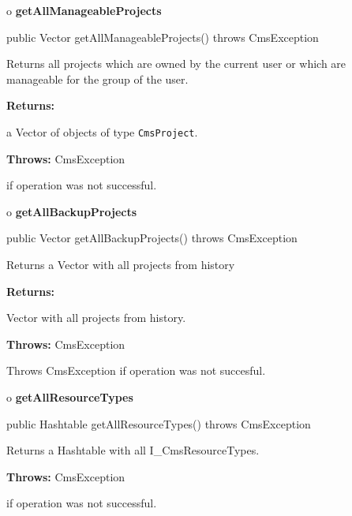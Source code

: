 o {\bf getAllManageableProjects} 

\begin{PRE}
 public Vector getAllManageableProjects() throws CmsException
\end{PRE}

\begin{description}
\htmlDD Returns all projects which are owned by the current user or which are
manageable for the group of the user. 

\begin{description}
\item {\bf Returns:}  

a Vector of objects of type {\tt CmsProject}.  
\item {\bf Throws:} CmsException  

if operation was not successful.  
\end{description}

\end{description}

o {\bf getAllBackupProjects} 

\begin{PRE}
 public Vector getAllBackupProjects() throws CmsException
\end{PRE}

\begin{description}
\htmlDD Returns a Vector with all projects from history 

\begin{description}
\item {\bf Returns:}  

Vector with all projects from history.  
\item {\bf Throws:} CmsException  

Throws CmsException if operation was not succesful.  
\end{description}

\end{description}

o {\bf getAllResourceTypes} 

\begin{PRE}
 public Hashtable getAllResourceTypes() throws CmsException
\end{PRE}

\begin{description}
\htmlDD Returns a Hashtable with all I\_CmsResourceTypes. 

\begin{description}
\item {\bf Throws:} CmsException  

if operation was not successful.  
\end{description}

\end{description}

